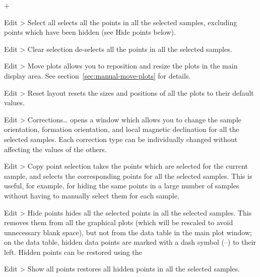 \documentclass[a4paper]{article}
\newcommand{\menuitemlabel}[1]{%
\mbox{\textsf{#1}}\hfil}
\newenvironment{menuitemlist}%
{\begin{list}{}{%
\renewcommand{\makelabel}{\menuitemlabel}%
\setlength{\labelwidth}{35pt}%
\setlength{\leftmargin}%
             {\labelwidth+\labelsep}}}%
{\end{list}}
\newcommand{\ppcmd}[1]{\textsf{#1}} %
\newcommand{\submenu}{ \textgreater{} } %
\begin{document}
\begin{menuitemlist}

\item[Edit\submenu Select all] selects all the points in all the selected
samples, excluding points which have been hidden (see \ppcmd{Hide points}
below).

\item[Edit\submenu Clear selection] de-selects all the points in all
the selected samples.

\item[Edit\submenu Move plots] allows you to reposition and resize the plots
  in the main display area. See section~\ref{sec:manual-move-plots} for
  details.

\item[Edit\submenu Reset layout] resets the sizes and positions of
all the plots to their default values.

\item[Edit\submenu Corrections\ldots] opens a window which allows you to
change the sample orientation, formation orientation, and local magnetic
declination for all the selected samples. Each correction type can be
individually changed without affecting the values of the others.

\item[Edit\submenu Copy point selection] takes the points which are
selected for the current sample, and selects the corresponding points
for all the selected samples. This is useful, for example, for hiding
the same points in a large number of samples without having to
manually select them for each sample.


\item[Edit\submenu Hide points] hides all the selected points in all the
selected samples. This removes them from all the graphical plots (which will
be rescaled to avoid unnecessary blank space), but not from the data table in
the main plot window; on the data table, hidden data points are marked with a
dash symbol (--) to their left. Hidden points can be restored using the

\item[Edit\submenu Show all points] restores all hidden points in all
the selected samples.




\end{menuitemlist}
\end{document}
